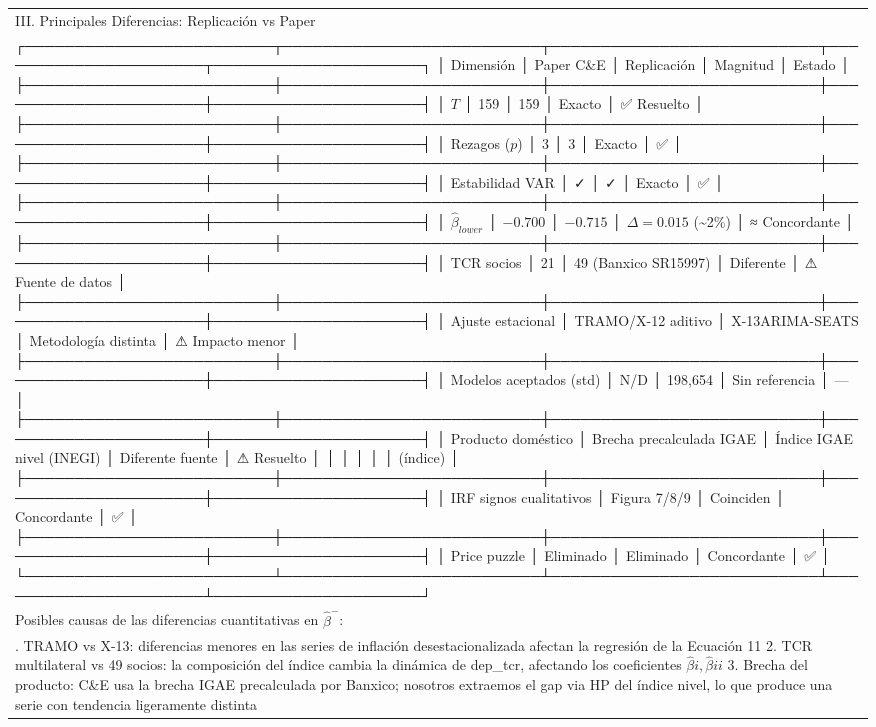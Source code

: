 \documentclass[
]{article}
\begin{document}
\begin{longtable}[]{@{}
  >{\raggedright\arraybackslash}p{}@{}}
\toprule\noalign{}
\endhead
\bottomrule\noalign{}
\endlastfoot
III. Principales Diferencias: Replicación vs Paper \\
┌─────────────────────────┬──────────────────────────┬───────────────────────────┬──────────────────────┬─────────────────────┐
│ Dimensión │ Paper C\&E │ Replicación │ Magnitud │ Estado │
├─────────────────────────┼──────────────────────────┼───────────────────────────┼──────────────────────┼─────────────────────┤
│ \(T\) │ 159 │ 159 │ Exacto │ ✅ Resuelto │
├─────────────────────────┼──────────────────────────┼───────────────────────────┼──────────────────────┼─────────────────────┤
│ Rezagos (\(p\)) │ 3 │ 3 │ Exacto │ ✅ │
├─────────────────────────┼──────────────────────────┼───────────────────────────┼──────────────────────┼─────────────────────┤
│ Estabilidad VAR │ ✓ │ ✓ │ Exacto │ ✅ │
├─────────────────────────┼──────────────────────────┼───────────────────────────┼──────────────────────┼─────────────────────┤
│ \(\hat{\beta}_{lower}\) │ \(-0.700\) │ \(-0.715\) │ \(\Delta=0.015\)
(\textasciitilde2\%) │ ≈ Concordante │
├─────────────────────────┼──────────────────────────┼───────────────────────────┼──────────────────────┼─────────────────────┤
│ TCR socios │ 21 │ 49 (Banxico SR15997) │ Diferente │ ⚠ Fuente de datos
│
├─────────────────────────┼──────────────────────────┼───────────────────────────┼──────────────────────┼─────────────────────┤
│ Ajuste estacional │ TRAMO/X-12 aditivo │ X-13ARIMA-SEATS │ Metodología
distinta │ ⚠ Impacto menor │
├─────────────────────────┼──────────────────────────┼───────────────────────────┼──────────────────────┼─────────────────────┤
│ Modelos aceptados (std) │ N/D │ 198,654 │ Sin referencia │ --- │
├─────────────────────────┼──────────────────────────┼───────────────────────────┼──────────────────────┼─────────────────────┤
│ Producto doméstico │ Brecha precalculada IGAE │ Índice IGAE nivel
(INEGI) │ Diferente fuente │ ⚠ Resuelto │ │ │ │ │ │ (índice) │
├─────────────────────────┼──────────────────────────┼───────────────────────────┼──────────────────────┼─────────────────────┤
│ IRF signos cualitativos │ Figura 7/8/9 │ Coinciden │ Concordante │ ✅
│
├─────────────────────────┼──────────────────────────┼───────────────────────────┼──────────────────────┼─────────────────────┤
│ Price puzzle │ Eliminado │ Eliminado │ Concordante │ ✅ │
└─────────────────────────┴──────────────────────────┴───────────────────────────┴──────────────────────┴─────────────────────┘ \\
Posibles causas de las diferencias cuantitativas en
\(\hat{\beta}^-\): \\
1. TRAMO vs X-13: diferencias menores en las series de inflación
desestacionalizada afectan la regresión de la Ecuación 11 2. TCR
multilateral vs 49 socios: la composición del índice cambia la dinámica
de dep\_tcr, afectando los coeficientes
\(\hat{\beta}i, \hat{\beta}{ii}\) 3. Brecha del producto: C\&E usa la
brecha IGAE precalculada por Banxico; nosotros extraemos el gap via HP
del índice nivel, lo que produce una serie con tendencia ligeramente
distinta \\
\end{longtable}
\end{document}
